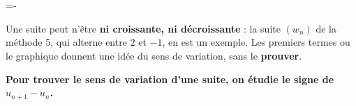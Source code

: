 \documentclass[11pt,a4paper]{article}
\makeatletter
\newcommand{\lycee@gradx}[1]{\foreach \k/\l in {#1}{%
  \draw (\k,0.07)--(\k,-0.07) node[below,font=\scriptsize,inner sep=1.5pt]{$\l$};}}
\newcommand{\lycee@grady}[1]{\foreach \k/\l in {#1}{%
  \draw (0.07,\k)--(-0.07,\k) node[left,font=\scriptsize,inner sep=1.5pt]{$\l$};}}
\providecommand{\gradx}{\lycee@gradx}%
\providecommand{\grady}{\lycee@grady}%
\newcommand{\besoinplace}[1]{\par\penalty\@M\begingroup
  \dimen@=#1\relax\dimen@ii=\pagegoal\advance\dimen@ii-\pagetotal
  \ifdim\dimen@>\dimen@ii\ifdim\dimen@ii>\z@\vfil\fi\break\fi\endgroup}
\makeatother
\begin{document}
\begin{center}
\begin{minipage}[t]{0.4\linewidth}
\\[2pt]
\end{minipage}\qquad
\begin{minipage}[t]{0.4\linewidth}
\\[2pt]
\end{minipage}
\end{center}

\besoinplace{6\baselineskip}
\begin{remarquebox}
Une suite peut n'être \textbf{ni croissante, ni décroissante} : la suite $(w_{n})$ de la
méthode 5, qui alterne entre $2$ et $-1$, en est un exemple. Les premiers termes ou le
graphique donnent une idée du sens de variation, sans le \textbf{prouver}.
\end{remarquebox}

\begin{center}
\textbf{Pour trouver le sens de variation d'une suite, on étudie le signe de
$u_{n+1}-u_{n}$.}
\end{center}
\end{document}
